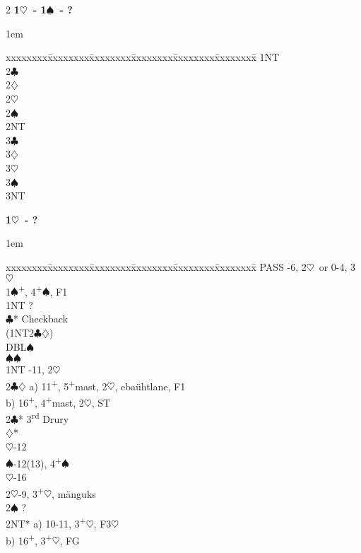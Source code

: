 \documentclass[10pt]{article}
\renewcommand{\c}{$\clubsuit$}
\renewcommand{\d}{$\diamondsuit$}
\newcommand{\h}{$\heartsuit$}
\newcommand{\s}{$\spadesuit$}
\newcommand{\p}{\textsuperscript{+}}
\newcommand{\m}{\textsuperscript{\textminus}}
\newcommand{\x}{DBL}
\newcommand{\rdh}{3\textsuperscript{rd}}
\newenvironment{bidtable}[1][]
{\textbf{#1}
  \begin{adjustwidth}{1em}{}
    \addvspace{2pt}
    \begin{tabbing}
      xxxxxxxx\=xxxxxxxx\=xxxxxxxx\=xxxxxxxx\=xxxxxxxx\=xxxxxxxx\=\kill}
{\end{tabbing}\end{adjustwidth}\bigskip}%
\begin{document}
\begin{multicols*}{2}
\begin{bidtable}[1\h\ - 1\s\ - ?]
1NT \>  \\
2\c \>  \\
2\d \>  \\
2\h \>  \\
2\s \>  \\
2NT \>  \\
3\c \>  \\
3\d \>  \\
3\h \>  \\
3\s \>  \\
3NT \>  \\
\end{bidtable}
\begin{bidtable}[1\h\ - ?]
PASS       -6, 2\m\h\ or 0-4, 3\h                    \\
1\s        {}\p, 4\p\s , F1                             \\
           \> 1NT        \> ?                             \\
           \>            \c* \> Checkback             \\
           \> (1NT2\c\d) \>                               \\
           \>            \> \x   {}\s                   \\
           \>            \s  {}\s                   \\
1NT        -11, 2\m\h                                 \\
2\c\d      \> a) 11\p, 5\p mast, 2\m\h, ebaühtlane, F1    \\
           \> b) 16\p, 4\p mast, 2\m\h, ST                \\
2\c* \rdh  \> Drury                                       \\
           \d*       {}\m                           \\
           \h        {}-12                         \\
           \s        {}-12(13), 4\p\s               \\
           \h        {}-16                         \\
2\h        {}-9, 3\p\h, mänguks                         \\
2\s        \> ?                                           \\
2NT*       \> a) 10-11, 3\p\h, F3\h                       \\
           \> b) 16\p, 3\p\h, FG                          \\

\end{bidtable}
\end{multicols*}
\end{document}
